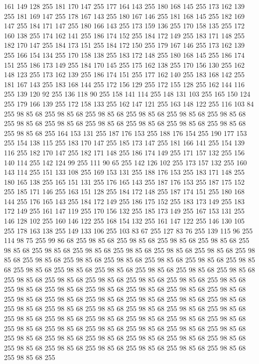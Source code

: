 161 149 128 255 181 170 147 255 177 164 143 255 180 168 145 255 173 162 139 255 181 169 147 255 178 167 143 255 180 167 146 255 181 168 145 255 182 169 147 255 184 171 147 255 180 166 143 255 173 159 136 255 170 158 135 255 172 160 138 255 174 162 141 255 186 174 152 255 184 172 149 255 183 171 148 255 182 170 147 255 184 173 151 255 184 172 150 255 179 167 146 255 173 162 139 255 166 154 134 255 170 158 138 255 183 172 148 255 180 168 145 255 186 174 151 255 186 173 149 255 184 170 145 255 175 162 138 255 170 156 130 255 162 148 123 255 173 162 139 255 186 174 151 255 177 162 140 255 183 168 142 255 181 167 143 255 183 168 144 255 172 156 129 255 172 155 128 255 162 144 116 255 139 120 92 255 136 118 90 255 158 141 114 255 148 131 103 255 165 150 124 255 179 166 139 255 172 158 133 255 162 147 121 255 163 148 122 255 116 103 84 255 98 85 68 255 98 85 68 255 98 85 68 255 98 85 68 255 98 85 68 255 98 85 68 255 98 85 68 255 98 85 68 255 98 85 68 255 98 85 68 255 98 85 68 255
98 85 68 255 98 85 68 255 164 153 131 255 187 176 153 255 188 176 154 255 190 177 153 255 154 138 115 255 183 170 147 255 185 173 147 255 181 166 141 255 154 139 116 255 182 170 147 255 182 171 148 255 186 174 149 255 171 157 132 255 156 140 114 255 142 124 99 255 111 90 65 255 142 126 102 255 173 157 132 255 160 143 114 255 151 133 108 255 169 153 131 255 188 176 153 255 183 171 148 255 180 165 138 255 165 151 131 255 176 165 143 255 187 176 153 255 187 175 152 255 185 171 146 255 163 151 128 255 184 172 148 255 187 174 151 255 180 168 144 255 176 165 143 255 184 172 149 255 186 175 152 255 183 173 149 255 183 172 149 255 161 147 119 255 170 156 132 255 185 173 149 255 167 153 131 255 146 128 102 255 160 146 122 255 168 154 132 255 161 147 122 255 146 130 105 255 178 163 138 255 149 133 106 255 103 83 67 255 127 83 76 255 139 115 96 255 114 98 75 255 99 86 68 255 98 85 68 255 98 85 68 255 98 85 68 255 98 85 68 255 98 85 68 255 98 85 68 255 98 85 68 255 98 85 68 255
98 85 68 255 98 85 68 255 98 85 68 255 98 85 68 255 98 85 68 255 98 85 68 255 98 85 68 255 98 85 68 255 98 85 68 255 98 85 68 255 98 85 68 255 98 85 68 255 98 85 68 255 98 85 68 255 98 85 68 255 98 85 68 255 98 85 68 255 98 85 68 255 98 85 68 255 98 85 68 255 98 85 68 255 98 85 68 255 98 85 68 255 98 85 68 255 98 85 68 255 98 85 68 255 98 85 68 255 98 85 68 255 98 85 68 255 98 85 68 255 98 85 68 255 98 85 68 255 98 85 68 255 98 85 68 255 98 85 68 255 98 85 68 255 98 85 68 255 98 85 68 255 98 85 68 255 98 85 68 255 98 85 68 255 98 85 68 255 98 85 68 255 98 85 68 255 98 85 68 255 98 85 68 255 98 85 68 255 98 85 68 255 98 85 68 255 98 85 68 255 98 85 68 255 98 85 68 255 98 85 68 255 98 85 68 255 98 85 68 255 98 85 68 255 98 85 68 255 98 85 68 255 98 85 68 255 98 85 68 255 98 85 68 255 98 85 68 255 98 85 68 255 98 85 68 255
